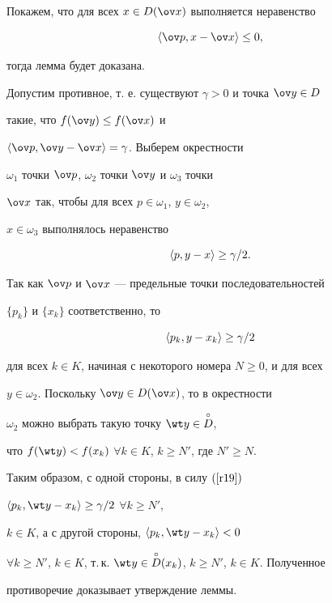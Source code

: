 \begin{pf}


Покажем, что для всех $x\in D(\ov x)$ выполняется неравенство


$$


\la \ov p, x- \ov x \ra \le 0,


$$


тогда лемма будет доказана.


Допустим противное, т. е. существуют $\gamma>0$ и точка $\ov y \in D$


такие, что $f(\ov y)\le f(\ov x)$ и


$\la \ov p, \ov y- \ov x \ra = \gamma$. Выберем окрестности


$\omega_1$ точки $\ov p$, $\omega_2$ точки $\ov y$ и $\omega_3$ точки


$\ov x$ так, чтобы для всех $p\in \omega_1$, $y\in \omega_2$,


$x\in \omega_3$ выполнялось неравенство


$$


\la p, y- x \ra \ge \gamma/2.


$$


Так как $\ov p$ и $\ov x$ --- предельные точки последовательностей


$\{p_k\}$ и $\{x_k\}$ соответственно, то




\begin{equation} \label{r19}


\la p_k, y- x_k \ra \ge \gamma/2


\end{equation}


%


для всех $k\in K$, начиная с некоторого номера $N\ge 0$, и для всех


$y\in \omega_2$. Поскольку $\ov y\in D(\ov x)$, то в окрестности


$\omega_2$ можно выбрать такую точку $\wt y \in


\overset{\circ}{D}{}$,


что $f(\wt y)< f(x_k)$ $\forall k\in K$, $k\ge N'$, где $N'\ge N$.


Таким образом, с одной стороны, в силу $(\ref{r19})$


$\la p_k,\wt y- x_k \ra \ge \gamma/2$ $\forall k\ge N'$,


$k\in K$, а с другой стороны, $\la p_k, \wt y- x_k \ra <0$


$\forall k\ge N'$, $k\in K$, т.\,к. $\wt y \in


\overset{\circ}{D}{}(x_k)$, $k\ge N'$, $k\in K$. Полученное


противоречие доказывает утверждение леммы.


\end{pf}





